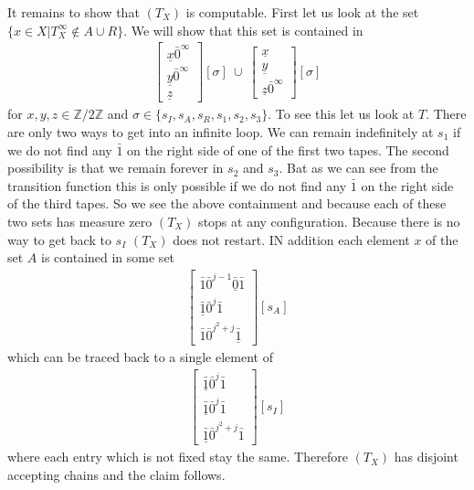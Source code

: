 \documentclass[12pt,a4paper]{scrartcl}
\numberwithin{equation}{section}
\newcommand{\2}{\mathbb{Z} / 2 \mathbb{Z}}
\newcommand{\1}{\bar{1}}
\newcommand{\0}{\bar{0}}
\begin{document}
It remains to show that $(T_X)$ is computable. First let us look at the set $\{x \in X | T_X^\infty \notin A \cup R\}$. We will show that this set is contained in
\begin{align*}
	\begin{bmatrix}
		\underline{x} \0^\infty \\
		\underline{y} \0^\infty \\
		\underline{z}
	\end{bmatrix} [\sigma] \ \cup \
	\begin{bmatrix}
		\underline{x} \\
		\underline{y} \\
		\underline{z} \0^\infty
	\end{bmatrix} [\sigma]
\end{align*} for $x, y, z \in \2$ and $\sigma \in \{s_I, s_A, s_R, s_1, s_2, s_3\}$.
To see this let us look at $T$. There are only two ways to get into an infinite loop. We can remain indefinitely at $s_1$ if we do not find any $\1$ on the right side of one of the first two tapes. The second possibility is that we remain forever in $s_2$ and $s_3$. Bat as we can see from the transition function this is only possible if we do not find any $\1$ on the  right side of the third tapes. So we see the above containment and because each of these two sets has measure zero $(T_X)$ stops at any configuration. 
Because there is no way to get back to $s_I$ $(T_X)$ does not restart. IN addition each element $x$ of the set $A$ is contained in some set
\begin{align*}
	\begin{bmatrix}
		\1 \0^{j - 1} \underline{\0} \1 \\
		\underline{\1} \0^j \1 \\
		\1 \0^{j^2 + j} \underline{\1}
	\end{bmatrix}[s_A]
\end{align*}
which can be traced back to a single element of 
\begin{align*}
	\begin{bmatrix}
		\underline{\1} \0^j \1 \\
		\underline{\1} \0^j \1 \\
		\underline{\1} \0^{j^2 + j} \1
	\end{bmatrix}[s_I]
\end{align*}
where each entry which is not fixed stay the same. Therefore $(T_X)$ has disjoint accepting chains and the claim follows.
  \newpage
\end{document}
